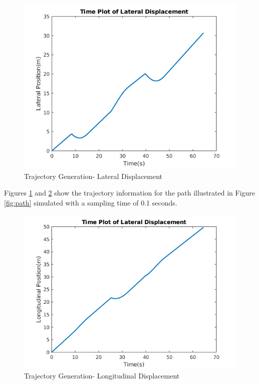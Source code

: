 \documentclass[a4paper, twocolumn]{article}
\begin{document}
\begin{figure}[H]
    \centering
    \includegraphics[scale=.45]{presentation/img/traj_lat.png}
    \caption{Trajectory Generation- Lateral Displacement}
    \label{fig:traj_lat}
\end{figure}

Figures \ref{fig:traj_lat} and \ref{fig:traj_lon} show the trajectory information for the path illustrated in Figure \ref{fig:path} simulated with a 
sampling time of 0.1 seconds.

\begin{figure}
    \centering
    \includegraphics[scale=.45]{presentation/img/traj_lon.png}
    \caption{Trajectory Generation- Longitudinal Displacement}
    \label{fig:traj_lon}
\end{figure}
\end{document}
